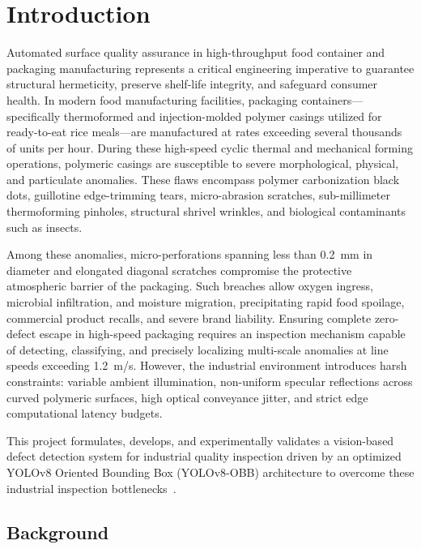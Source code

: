 \chapter{Introduction}
\label{ch:intro}

Automated surface quality assurance in high-throughput food container and packaging manufacturing represents a critical engineering imperative to guarantee structural hermeticity, preserve shelf-life integrity, and safeguard consumer health. In modern food manufacturing facilities, packaging containers---specifically thermoformed and injection-molded polymer casings utilized for ready-to-eat rice meals---are manufactured at rates exceeding several thousands of units per hour. During these high-speed cyclic thermal and mechanical forming operations, polymeric casings are susceptible to severe morphological, physical, and particulate anomalies. These flaws encompass polymer carbonization black dots, guillotine edge-trimming tears, micro-abrasion scratches, sub-millimeter thermoforming pinholes, structural shrivel wrinkles, and biological contaminants such as insects.

Among these anomalies, micro-perforations spanning less than 0.2~mm in diameter and elongated diagonal scratches compromise the protective atmospheric barrier of the packaging. Such breaches allow oxygen ingress, microbial infiltration, and moisture migration, precipitating rapid food spoilage, commercial product recalls, and severe brand liability. Ensuring complete zero-defect escape in high-speed packaging requires an inspection mechanism capable of detecting, classifying, and precisely localizing multi-scale anomalies at line speeds exceeding 1.2~m/s. However, the industrial environment introduces harsh constraints: variable ambient illumination, non-uniform specular reflections across curved polymeric surfaces, high optical conveyance jitter, and strict edge computational latency budgets.

This project formulates, develops, and experimentally validates a vision-based defect detection system for industrial quality inspection driven by an optimized YOLOv8 Oriented Bounding Box (YOLOv8-OBB) architecture to overcome these industrial inspection bottlenecks~\cite{wang2024rgs,terven2023yolo}.

\section{Background}
\label{sec:background}


